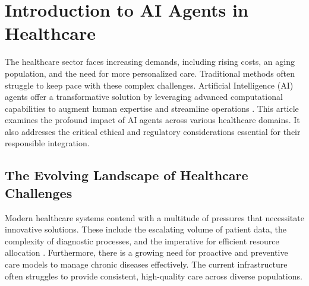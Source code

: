 \documentclass[12pt,a4paper]{article}
\begin{document}
\begin{abstract}
The integration of Artificial Intelligence (AI) agents into healthcare represents a pivotal technological advancement, offering unprecedented opportunities to enhance accessibility, precision, and efficiency. This article explores the multifaceted applications of AI agents, ranging from improving diagnostic accuracy and personalizing treatment plans to streamlining operational workflows and fostering patient engagement. While these agents hold immense promise, their successful and ethical deployment necessitates a robust framework. This framework must address critical challenges such as data privacy, algorithmic bias, and the establishment of comprehensive regulatory oversight. The article argues for a balanced approach, emphasizing the crucial role of human-AI collaboration rather than replacement. It highlights the significance of AI agents in addressing contemporary healthcare demands, ultimately aiming to augment human capabilities and reshape future healthcare delivery models responsibly.
\end{abstract}

\section{Introduction to AI Agents in Healthcare}
The healthcare sector faces increasing demands, including rising costs, an aging population, and the need for more personalized care. Traditional methods often struggle to keep pace with these complex challenges. Artificial Intelligence (AI) agents offer a transformative solution by leveraging advanced computational capabilities to augment human expertise and streamline operations \cite{nih}. This article examines the profound impact of AI agents across various healthcare domains. It also addresses the critical ethical and regulatory considerations essential for their responsible integration.

\subsection{The Evolving Landscape of Healthcare Challenges}
Modern healthcare systems contend with a multitude of pressures that necessitate innovative solutions. These include the escalating volume of patient data, the complexity of diagnostic processes, and the imperative for efficient resource allocation \cite{topol2019highperformance}. Furthermore, there is a growing need for proactive and preventive care models to manage chronic diseases effectively. The current infrastructure often struggles to provide consistent, high-quality care across diverse populations.
\end{document}
